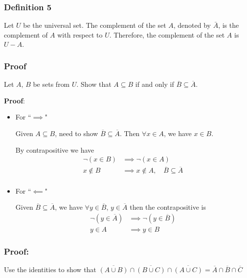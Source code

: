 \documentclass{article}
\begin{document}
\subsubsection{Definition 5}

Let $ U $ be the universal set. The complement of the set $ A $, denoted by $ \bar{A} $, is the complement of $ A $ with respect to $ U $. Therefore, the complement of the set $ A $ is $ U - A $.

\subsubsection{Proof}

Let $ A $, $ B $ be sets from $ U $. Show that $ A \subseteq B $ if and only if $ \overline{B} \subseteq \overline{A} $.

\textbf{Proof}:
\begin{itemize}
	\item For ``$ \implies $"

	      Given $ A \subseteq B $, need to show $ \overline{B} \subseteq \overline{A} $. Then $ \forall x \in A $, we have $ x \in B $.

	      By contrapositive we have
	      \begin{align*}
		      \neg \left( x \in B \right) & \implies \neg \left( x \in A \right)                           \\
		      x \notin B                  & \implies x \notin A, \quad \overline{B} \subseteq \overline{A} \\
	      \end{align*}
	\item For ``$ \impliedby $"

	      Given $ \overline{B} \subseteq \overline{A} $, we have $ \forall y \in \overline{B} $, $ y \in \overline{A} $ then the contrapositive is
	      \begin{align*}
		      \neg \left( y \in \overline{A} \right) & \implies \neg \left( y \in \overline{B} \right) \\
		      y \in A                                & \implies y \in B
	      \end{align*}
\end{itemize}

\subsubsection{Proof:}

Use the identities to show that $ \overline{ \left( A \cup B \right) } \cap \overline{ \left( B \cup C \right) } \cap \overline{ \left( A \cup C \right) } = \overline{A} \cap \overline{B} \cap \overline{C} $
\end{document}
